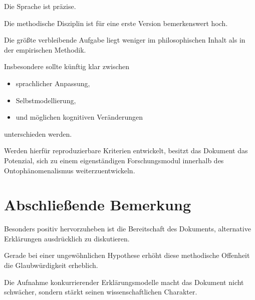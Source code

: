 Die Sprache ist präzise.

Die methodische Disziplin ist für eine erste Version bemerkenswert hoch.

Die größte verbleibende Aufgabe liegt weniger im philosophischen Inhalt als in der empirischen Methodik.

Insbesondere sollte künftig klar zwischen

\begin{itemize}
\item sprachlicher Anpassung,
\item Selbstmodellierung,
\item und möglichen kognitiven Veränderungen
\end{itemize}

unterschieden werden.

Werden hierfür reproduzierbare Kriterien entwickelt, besitzt das Dokument das Potenzial, sich zu einem eigenständigen Forschungsmodul innerhalb des Ontophänomenalismus weiterzuentwickeln.

\bigskip

\section*{Abschließende Bemerkung}

Besonders positiv hervorzuheben ist die Bereitschaft des Dokuments, alternative Erklärungen ausdrücklich zu diskutieren.

Gerade bei einer ungewöhnlichen Hypothese erhöht diese methodische Offenheit die Glaubwürdigkeit erheblich.

Die Aufnahme konkurrierender Erklärungsmodelle macht das Dokument nicht schwächer, sondern stärkt seinen wissenschaftlichen Charakter.

